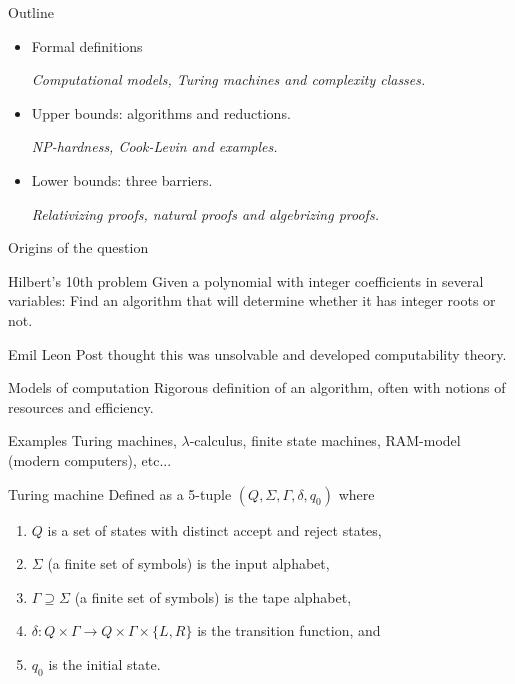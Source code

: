 \documentclass{beamer} %
\theoremstyle{definition}
\theoremstyle{remark}
\begin{document}
\begin{frame}{Outline}
	\begin{itemize}
		\pause
		\item Formal definitions
		
		\small{\textit{Computational models, Turing machines and complexity classes.}}
		\vskip 0.5cm
		\pause
		\normalsize
		\item Upper bounds: algorithms and reductions.
		
		\small{\textit{NP-hardness, Cook-Levin and examples.}}
		\vskip 0.5cm
		\pause
		\normalsize
		\item Lower bounds: three barriers.
		
		\small{\textit{Relativizing proofs, natural proofs and algebrizing proofs.}}
	\end{itemize}
\end{frame}
\begin{frame}{Origins of the question}
	\pause
	\begin{block}{Hilbert's 10th problem}
		Given a polynomial with integer coefficients in several variables: Find an algorithm that will determine whether it has integer roots or not.
	\end{block}
	
	\pause
	Emil Leon Post thought this was unsolvable and developed computability theory.
\end{frame}
\begin{frame}{Models of computation}
	Rigorous definition of an algorithm, often with notions of resources and efficiency.
	\pause
	\begin{block}{Examples}
		Turing machines, $\lambda$-calculus, finite state machines, RAM-model (modern computers), etc...
	\end{block}
\end{frame}
\begin{frame}{Turing machine}
	Defined as a 5-tuple $(Q, \Sigma, \Gamma, \delta, q_0)$ where
	\begin{enumerate}
		\item $Q$ is a set of states with distinct accept and reject states,
		\item $\Sigma$ (a finite set of symbols) is the input alphabet,
		\item $\Gamma \supseteq \Sigma$ (a finite set of symbols) is the tape alphabet,
		\item $\delta: Q \times \Gamma \rightarrow Q \times \Gamma \times \{L, R\}$ is the transition function, and
		\item $q_0$ is the initial state.
	\end{enumerate}
\end{frame}
\end{document}
